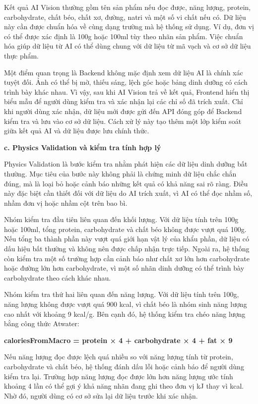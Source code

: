 Kết quả AI Vision thường gồm tên sản phẩm nếu đọc được, năng lượng, protein, carbohydrate, chất béo, chất xơ, đường, natri và một số vi chất nếu có. Dữ liệu này cần được chuẩn hóa về cùng dạng trường mà hệ thống sử dụng. Ví dụ, đơn vị có thể được xác định là 100g hoặc 100ml tùy theo nhãn sản phẩm. Việc chuẩn hóa giúp dữ liệu từ AI có thể dùng chung với dữ liệu từ mã vạch và cơ sở dữ liệu thực phẩm.

Một điểm quan trọng là Backend không mặc định xem dữ liệu AI là chính xác tuyệt đối. Ảnh có thể bị mờ, thiếu sáng, lệch góc hoặc bảng dinh dưỡng có cách trình bày khác nhau. Vì vậy, sau khi AI Vision trả về kết quả, Frontend hiển thị biểu mẫu để người dùng kiểm tra và xác nhận lại các chỉ số đã trích xuất. Chỉ khi người dùng xác nhận, dữ liệu mới được gửi đến API đóng góp để Backend kiểm tra và lưu vào cơ sở dữ liệu. Cách xử lý này tạo thêm một lớp kiểm soát giữa kết quả AI và dữ liệu được lưu chính thức.

\textbf{c. Physics Validation và kiểm tra tính hợp lý}

Physics Validation là bước kiểm tra nhằm phát hiện các dữ liệu dinh dưỡng bất thường. Mục tiêu của bước này không phải là chứng minh dữ liệu chắc chắn đúng, mà là loại bỏ hoặc cảnh báo những kết quả có khả năng sai rõ ràng. Điều này đặc biệt cần thiết đối với dữ liệu do AI trích xuất, vì AI có thể đọc nhầm số, nhầm đơn vị hoặc nhầm cột trên bao bì.

Nhóm kiểm tra đầu tiên liên quan đến khối lượng. Với dữ liệu tính trên 100g hoặc 100ml, tổng protein, carbohydrate và chất béo không được vượt quá 100g. Nếu tổng ba thành phần này vượt quá giới hạn vật lý của khẩu phần, dữ liệu có dấu hiệu bất thường và không nên được chấp nhận trực tiếp. Ngoài ra, hệ thống còn kiểm tra một số trường hợp cần cảnh báo như chất xơ lớn hơn carbohydrate hoặc đường lớn hơn carbohydrate, vì một số nhãn dinh dưỡng có thể trình bày carbohydrate theo cách khác nhau.

Nhóm kiểm tra thứ hai liên quan đến năng lượng. Với dữ liệu tính trên 100g, năng lượng không được vượt quá 900 kcal, vì chất béo là nhóm sinh năng lượng cao nhất với khoảng 9 kcal/g. Bên cạnh đó, hệ thống kiểm tra chéo năng lượng bằng công thức Atwater:

\textbf{caloriesFromMacro = protein × 4 + carbohydrate × 4 + fat × 9}

Nếu năng lượng đọc được lệch quá nhiều so với năng lượng tính từ protein, carbohydrate và chất béo, hệ thống đánh dấu lỗi hoặc cảnh báo để người dùng kiểm tra lại. Trường hợp năng lượng đọc được lớn hơn năng lượng ước tính khoảng 4 lần có thể gợi ý khả năng nhãn đang ghi theo đơn vị kJ thay vì kcal. Nhờ đó, người dùng có cơ sở sửa lại dữ liệu trước khi xác nhận.


